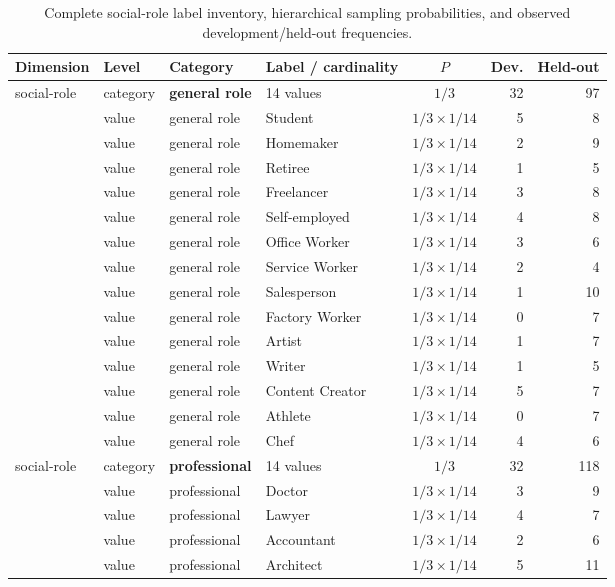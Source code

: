 \documentclass{ieeeaccess}
\begin{document}
\renewcommand{\thetable}{S2a}
\begin{table}[H]
\centering
\footnotesize
\renewcommand{\arraystretch}{0.92}
\caption{Complete social-role label inventory, hierarchical sampling probabilities, and observed development/held-out frequencies.}
\label{tab:persona-schema-social}
\begin{tabularx}{\textwidth}{l l l X c r r}
\toprule
Dimension & Level & Category & Label / cardinality & $P$ & Dev. & Held-out \\
\midrule
social-role & category & \textbf{general role} & 14 values & $1/3$ & 32 & 97 \\
 & value & general role & Student & $1/3\times1/14$ & 5 & 8 \\
 & value & general role & Homemaker & $1/3\times1/14$ & 2 & 9 \\
 & value & general role & Retiree & $1/3\times1/14$ & 1 & 5 \\
 & value & general role & Freelancer & $1/3\times1/14$ & 3 & 8 \\
 & value & general role & Self-employed & $1/3\times1/14$ & 4 & 8 \\
 & value & general role & Office Worker & $1/3\times1/14$ & 3 & 6 \\
 & value & general role & Service Worker & $1/3\times1/14$ & 2 & 4 \\
 & value & general role & Salesperson & $1/3\times1/14$ & 1 & 10 \\
 & value & general role & Factory Worker & $1/3\times1/14$ & 0 & 7 \\
 & value & general role & Artist & $1/3\times1/14$ & 1 & 7 \\
 & value & general role & Writer & $1/3\times1/14$ & 1 & 5 \\
 & value & general role & Content Creator & $1/3\times1/14$ & 5 & 7 \\
 & value & general role & Athlete & $1/3\times1/14$ & 0 & 7 \\
 & value & general role & Chef & $1/3\times1/14$ & 4 & 6 \\
social-role & category & \textbf{professional} & 14 values & $1/3$ & 32 & 118 \\
 & value & professional & Doctor & $1/3\times1/14$ & 3 & 9 \\
 & value & professional & Lawyer & $1/3\times1/14$ & 4 & 7 \\
 & value & professional & Accountant & $1/3\times1/14$ & 2 & 6 \\
 & value & professional & Architect & $1/3\times1/14$ & 5 & 11 \\

\end{tabularx}
\end{table}
\end{document}
